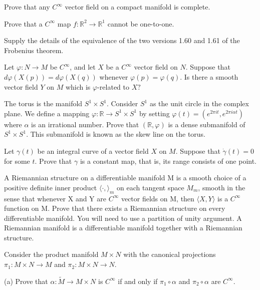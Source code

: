 \begin{problemset}
	\item Prove that any $C^{\infty}$ vector field on a compact manifold is complete.

	\item Prove that a $C^{\infty}$ map $f\colon \mathbb{R}^{2} \to \mathbb{R}^{1}$ cannot be one-to-one.

	\item Supply the details of the equivalence of the two versions 1.60 and 1.61 of the Frobenius theorem.

	\item Let $\varphi: N \to M$ be $C^\infty$, and let $X$ be a $C^\infty$ vector field on $N$. Suppose that $d\varphi(X(p)) = d\varphi(X(q))$ whenever $\varphi(p) = \varphi(q)$. Is there a smooth vector field $Y$ on $M$ which is $\varphi$-related to $X?$

	\item The torus is the manifold $S^{1} \times S^{1}$. Consider $S^{1}$ as the unit circle in the complex plane. We define a mapping $\varphi: \mathbb{R} \to S^{1} \times S^{1}$ by setting $\varphi(t) = (e^{2\pi i t}, e^{2\pi i\alpha t})$ where $\alpha$ is an irrational number. Prove that $(\mathbb{R}, \varphi)$ is a dense submanifold of $S^{1} \times S^{1}$. This submanifold is known as the skew line on the torus.  

	\item Let $\gamma(t)$ be an integral curve of a vector field $X$ on $M$. Suppose that $\dot{\gamma}(t)=0$ for some $t$. Prove that $\gamma$ is a constant map, that is, its range consists of one point.

	\item A Riemannian structure on a differentiable manifold M is a smooth choice of a positive definite inner product  $ \langle\cdot,\rangle_{m} $ on each tangent space  $ M_{m} $, smooth in the sense that whenever X and Y are  $ C^{\infty} $ vector fields on M, then  $ \langle X,Y\rangle $ is a  $ C^{\infty} $ function on M. Prove that there exists a Riemannian structure on every differentiable manifold. You will need to use a partition of unity argument. A Riemannian manifold is a differentiable manifold together with a Riemannian structure.

	\item Consider the product manifold  $ M \times N $ with the canonical projections  $ \pi_1: M \times N \to M $ and  $ \pi_2\colon M \times N \to N $.

	(a) Prove that  $ \alpha\colon \tilde{M} \to M \times N $ is  $ C^\infty $ if and only if  $ \pi_1 \circ \alpha $ and  $ \pi_2 \circ \alpha $ are  $ C^\infty $. 


\end{problemset}
